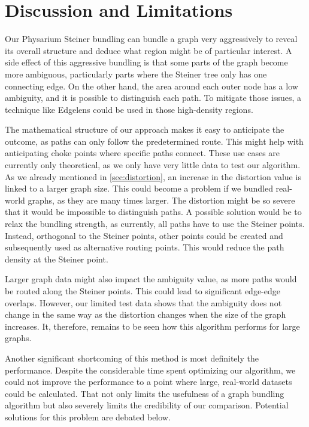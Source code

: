 
\chapter{Discussion and Limitations}
\label{sec:discussion}

Our Physarium Steiner bundling can bundle a graph very aggressively to reveal its overall structure and deduce what region might be of particular interest. A side effect of this aggressive bundling is that some parts of the graph become more ambiguous, particularly parts where the Steiner tree only has one connecting edge. On the other hand, the area around each outer node has a low ambiguity, and it is possible to distinguish each path. To mitigate those issues, a technique like Edgelens \cite{wong_edgelens_2003} could be used in those high-density regions. 

The mathematical structure of our approach makes it easy to anticipate the outcome, as paths can only follow the predetermined route. This might help with anticipating choke points where specific paths connect. These use cases are currently only theoretical, as we only have very little data to test our algorithm. As we already mentioned in \autoref{sec:distortion}, an increase in the distortion value is linked to a larger graph size. This could become a problem if we bundled real-world graphs, as they are many times larger. The distortion might be so severe that it would be impossible to distinguish paths. A possible solution would be to relax the bundling strength, as currently, all paths have to use the Steiner points. Instead, orthogonal to the Steiner points, other points could be created and subsequently used as alternative routing points. This would reduce the path density at the Steiner point. 

Larger graph data might also impact the ambiguity value, as more paths would be routed along the Steiner points. This could lead to significant edge-edge overlaps. However, our limited test data shows that the ambiguity does not change in the same way as the distortion changes when the size of the graph increases. It, therefore, remains to be seen how this algorithm performs for large graphs. 

Another significant shortcoming of this method is most definitely the performance. Despite the considerable time spent optimizing our algorithm, we could not improve the performance to a point where large, real-world datasets could be calculated. That not only limits the usefulness of a graph bundling algorithm but also severely limits the credibility of our comparison. Potential solutions for this problem are debated below.
